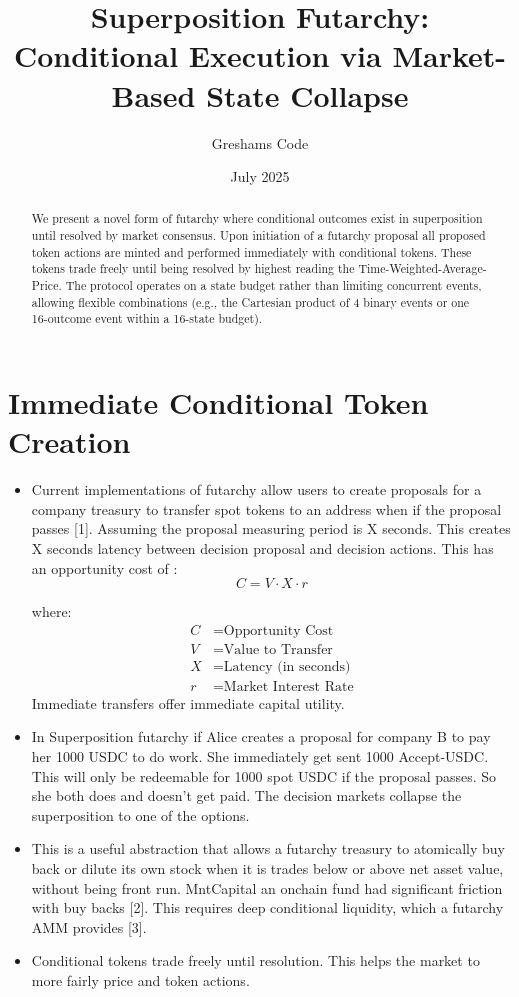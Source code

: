 \documentclass{article}
\title{Superposition Futarchy: Conditional Execution via Market-Based State Collapse}
\author[1]{Greshams Code}
\affil[1]{Founder, \href{https://govex.ai}{Govex.ai}}
\date{July 2025}
\begin{document}
\maketitle

\begin{abstract}
We present a novel form of futarchy where conditional outcomes exist in superposition until resolved by market consensus. Upon initiation of a futarchy proposal all proposed token actions are minted and performed immediately with conditional tokens. These tokens trade freely until being resolved by highest reading the Time-Weighted-Average-Price.
The protocol operates on a state budget rather than limiting concurrent events, allowing flexible combinations (e.g., the Cartesian product of 4 binary events or one 16-outcome event within a 16-state budget).
\end{abstract}


\section{Immediate Conditional Token Creation}
\begin{itemize}
    \item Current implementations of futarchy allow users to create proposals for a company treasury to transfer spot tokens to an address when if the proposal passes [1]. Assuming the proposal measuring period is X seconds. This creates X seconds latency between decision proposal and decision actions. This has an opportunity cost of : \begin{equation}
    C = V \cdot X \cdot r
    \end{equation}
    
    where:
    \begin{align*}
    C &= \text{Opportunity Cost} \\
    V &= \text{Value to Transfer} \\
    X &= \text{Latency (in seconds)} \\
    r &= \text{Market Interest Rate}
    \end{align*}
    Immediate transfers offer immediate capital utility.
    \item In Superposition futarchy if Alice creates a proposal for company B to pay her 1000 USDC to do work. She immediately get sent 1000 Accept-USDC. This will only be redeemable for 1000 spot USDC if the proposal passes. So she both does and doesn't get paid. The decision markets collapse the superposition to one of the options.
    \item This is a useful abstraction that allows a futarchy treasury to atomically buy back or dilute its own stock when it is trades below or above net asset value, without being front run. MntCapital an onchain fund had significant friction with buy backs [2]. This requires deep conditional liquidity, which a futarchy AMM provides [3].
   \item Conditional tokens trade freely until resolution. This helps the market to more fairly price and token actions. 

\end{itemize}
\end{document}
